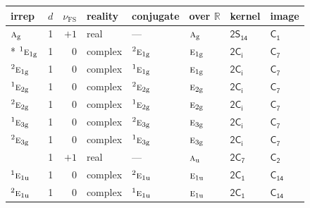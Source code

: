 \documentclass[10pt,a4paper]{article}
\numberwithin{equation}{section}
\newcommand{\grp}[1]{\mathsf{#1}}
\newcommand{\irr}[1]{\text{\normalfont\scshape #1}}
\newcommand{\conjpair}[1]{{}^{#1}}
\newcommand{\detbox}[1]{{\setlength{\fboxsep}{1pt}\fbox{#1}}}
\newcommand{\ptag}[1]{\mathrm{#1}}
\newcommand{\fsind}{\nu_{\mathrm{FS}}}
\begin{document}
{\small\renewcommand{\arraystretch}{1.25}\setlength{\tabcolsep}{4pt}\begin{longtable}{@{}lrrlllll@{}}\toprule
irrep & $d$ & $\fsind$ & reality & conjugate & over $\mathbb{R}$ & kernel & image\\\midrule\endhead
\bottomrule\endfoot\endlastfoot
$\irr{a}_{\ptag{g}}$ & 1 & $+1$ & real & --- & $\irr{a}_{\ptag{g}}$ & \href{2S14.pdf}{$\grp{2S_{14}}$} & \href{../../../rotation/data/pdf/C1.pdf}{$\grp{C_{1}}$}\\*
$\conjpair{1}\irr{e}_{1\ptag{g}}$ & 1 & $0$ & complex & $\conjpair{2}\irr{e}_{1\ptag{g}}$ & $\irr{e}_{1\ptag{g}}$ & \href{2S2.pdf}{$\grp{2C_{i}}$} & \href{../../../rotation/data/pdf/C7.pdf}{$\grp{C_{7}}$}\\
$\conjpair{2}\irr{e}_{1\ptag{g}}$ & 1 & $0$ & complex & $\conjpair{1}\irr{e}_{1\ptag{g}}$ & $\irr{e}_{1\ptag{g}}$ & \href{2S2.pdf}{$\grp{2C_{i}}$} & \href{../../../rotation/data/pdf/C7.pdf}{$\grp{C_{7}}$}\\
$\conjpair{1}\irr{e}_{2\ptag{g}}$ & 1 & $0$ & complex & $\conjpair{2}\irr{e}_{2\ptag{g}}$ & $\irr{e}_{2\ptag{g}}$ & \href{2S2.pdf}{$\grp{2C_{i}}$} & \href{../../../rotation/data/pdf/C7.pdf}{$\grp{C_{7}}$}\\
$\conjpair{2}\irr{e}_{2\ptag{g}}$ & 1 & $0$ & complex & $\conjpair{1}\irr{e}_{2\ptag{g}}$ & $\irr{e}_{2\ptag{g}}$ & \href{2S2.pdf}{$\grp{2C_{i}}$} & \href{../../../rotation/data/pdf/C7.pdf}{$\grp{C_{7}}$}\\
$\conjpair{1}\irr{e}_{3\ptag{g}}$ & 1 & $0$ & complex & $\conjpair{2}\irr{e}_{3\ptag{g}}$ & $\irr{e}_{3\ptag{g}}$ & \href{2S2.pdf}{$\grp{2C_{i}}$} & \href{../../../rotation/data/pdf/C7.pdf}{$\grp{C_{7}}$}\\
$\conjpair{2}\irr{e}_{3\ptag{g}}$ & 1 & $0$ & complex & $\conjpair{1}\irr{e}_{3\ptag{g}}$ & $\irr{e}_{3\ptag{g}}$ & \href{2S2.pdf}{$\grp{2C_{i}}$} & \href{../../../rotation/data/pdf/C7.pdf}{$\grp{C_{7}}$}\\
\detbox{$\irr{a}_{\ptag{u}}$} & 1 & $+1$ & real & --- & $\irr{a}_{\ptag{u}}$ & \href{2C7.pdf}{$\grp{2C_{7}}$} & \href{../../../rotation/data/pdf/C2.pdf}{$\grp{C_{2}}$}\\
$\conjpair{1}\irr{e}_{1\ptag{u}}$ & 1 & $0$ & complex & $\conjpair{2}\irr{e}_{1\ptag{u}}$ & $\irr{e}_{1\ptag{u}}$ & \href{2C1.pdf}{$\grp{2C_{1}}$} & $\grp{C_{14}}$\\
$\conjpair{2}\irr{e}_{1\ptag{u}}$ & 1 & $0$ & complex & $\conjpair{1}\irr{e}_{1\ptag{u}}$ & $\irr{e}_{1\ptag{u}}$ & \href{2C1.pdf}{$\grp{2C_{1}}$} & $\grp{C_{14}}$\\

\end{longtable}}
\end{document}

